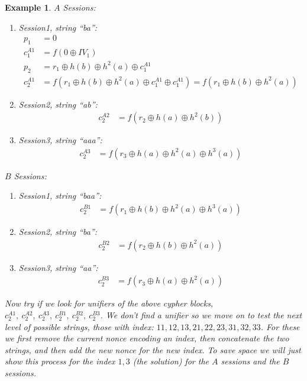 \documentclass{easychair}
\newtheorem{example}{Example}
\begin{document}
{\begin{example}
	\noindent
	$A$ Sessions:
	\begin{enumerate}
		\item Session1, string ``ba'':
		\begin{align*}
		p_1 &= 0\\
		c^{A1}_1 &= f(0 \oplus IV_{1})\\
		p_2 &= r_1 \oplus h(b) \oplus h^2(a) \oplus c^{A1}_1\\
		c^{A1}_2 &= f(r_1 \oplus h(b) \oplus h^2(a) \oplus c^{A1}_1 \oplus c^{A1}_1) = f(r_1 \oplus h(b) \oplus h^2(a))
		\end{align*}
		\item Session2, string ``ab'':
		\begin{align*}
			c^{A2}_2 &=f(r_2 \oplus h(a) \oplus h^2(b))
		\end{align*}
		\item Session3, string ``aaa'':
		\begin{align*}
			c^{A3}_2 &=f(r_3 \oplus h(a) \oplus h^2(a) \oplus h^3(a))
		\end{align*}
	\end{enumerate}
	
	\noindent
	$B$ Sessions:
\begin{enumerate}
	\item Session1, string ``baa'':
	\begin{align*}
	c^{B1}_2 &= f(r_1 \oplus h(b) \oplus h^2(a) \oplus h^3(a))
	\end{align*}
	\item Session2, string ``ba'':
	\begin{align*}
	c^{B2}_2 &= f(r_2 \oplus h(b) \oplus h^2(a))
	\end{align*}
	\item Session3, string ``aa'':
	\begin{align*}
	c^{B3}_2 &= f(r_3 \oplus h(a) \oplus h^2(a))
	\end{align*}
\end{enumerate}
 
Now try if we look for unifiers of the above cypher blocks, 
$c^{A1}_2, ~c^{A2}_2, ~c^{A3}_2, ~c^{B1}_2, ~c^{B2}_2, ~c^{B3}_2$.
We don't find a unifier so we move on to test the next level of
possible strings, those with index: $11, 12, 13, 21, 22, 23, 31, 32, 33$. For these we first remove the current nonce encoding an index, 
then concatenate the two strings, and then add the new nonce for the
new index.  To save space we will just show this process for 
the index $1,3$ (the solution) for the $A$ sessions and the $B$ sessions.


\end{example}}
\end{document}
